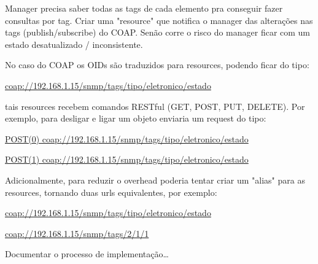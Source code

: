 \documentclass[twoside,english,brazilian]{UNISINOSmonografia}
\begin{document}
Manager precisa saber todas as tags de cada elemento pra conseguir fazer 
consultas por tag. Criar uma "resource" que notifica o manager das alterações 
nas tags (publish/subscribe) do COAP. Senão corre o risco do manager ficar com 
um estado desatualizado / inconsistente.

No caso do COAP os OIDs são traduzidos para resources, podendo ficar do tipo: 

\url{coap://192.168.1.15/snmp/tags/tipo/eletronico/estado}

tais resources recebem comandos RESTful (GET, POST, PUT, DELETE). Por exemplo, 
para desligar e ligar um objeto enviaria um request do tipo:

\url{POST(0) coap://192.168.1.15/snmp/tags/tipo/eletronico/estado}

\url{POST(1) coap://192.168.1.15/snmp/tags/tipo/eletronico/estado}

Adicionalmente, para reduzir o overhead poderia tentar criar um "alias" para 
as resources, tornando duas urls equivalentes, por exemplo:

\url{coap://192.168.1.15/snmp/tags/tipo/eletronico/estado}

\url{coap://192.168.1.15/snmp/tags/2/1/1}

	
	
	

	Documentar o processo de implementação\ldots
	
	
	
	



%
\end{document}
